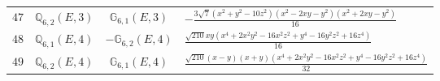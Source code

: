 \documentclass[fleqn,8pt,landscape]{jsarticle}
\begin{document}
\begin{table}[ht!]
\begin{center}
\begin{tabular}{cccl}
$ 47 $ & $ \mathbb{Q}_{6,2}(E,3) $ & $ \mathbb{G}_{6,1}(E,3) $ & $ - \frac{3 \sqrt{7} \left(x^{2} + y^{2} - 10 z^{2}\right) \left(x^{2} - 2 x y - y^{2}\right) \left(x^{2} + 2 x y - y^{2}\right)}{16} $ \\
$ 48 $ & $ \mathbb{Q}_{6,1}(E,4) $ & $ -\mathbb{G}_{6,2}(E,4) $ & $ \frac{\sqrt{210} x y \left(x^{4} + 2 x^{2} y^{2} - 16 x^{2} z^{2} + y^{4} - 16 y^{2} z^{2} + 16 z^{4}\right)}{16} $ \\
$ 49 $ & $ \mathbb{Q}_{6,2}(E,4) $ & $ \mathbb{G}_{6,1}(E,4) $ & $ \frac{\sqrt{210} \left(x - y\right) \left(x + y\right) \left(x^{4} + 2 x^{2} y^{2} - 16 x^{2} z^{2} + y^{4} - 16 y^{2} z^{2} + 16 z^{4}\right)}{32} $ \\
 \hline \hline
\end{tabular}
\end{center}
\end{table}
\end{document}
